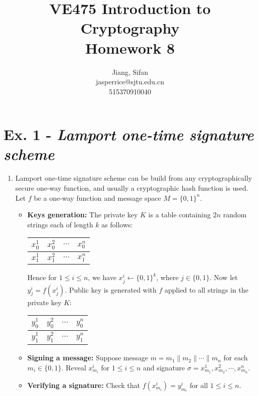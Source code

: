 \documentclass[11pt,a4paper]{article}
\title{
	VE475 Introduction to Cryptography \\
	Homework 8
}
\author{
	Jiang, Sifan\\
	jasperrice@sjtu.edu.cn\\
	515370910040
}
\begin{document}
\maketitle
\section*{Ex. 1 - \textit{Lamport one-time signature scheme}}
\begin{enumerate}
\item Lamport one-time signature scheme can be build from any cryptographically secure one-way function, and usually a cryptographic hash function is used. Let $f$ be a one-way function and message space $M = \{0, 1\}^{n}$.
	\begin{itemize}
	\item \textbf{Keys generation:} The private key $K$ is a table containing $2n$ random strings each of length $k$ as follows:
		\begin{table}[!ht]
			\centering
			\begin{tabular}{|c|c|c|c|}
				\hline
				$x_{0}^{1}$ & $x_{0}^{2}$ & $\cdots$ & $x_{0}^{n}$ \\
				\hline
				$x_{1}^{1}$ & $x_{1}^{2}$ & $\cdots$ & $x_{1}^{n}$ \\
				\hline
			\end{tabular}
		\end{table}
	\par Hence for $1 \leq i \leq n$, we have $x_{j}^{i} \leftarrow \{0, 1\}^{k}$, where $j \in \{0, 1\}$. Now let $y_{j}^{i} = f(x_{j}^{i})$. Public key is generated with $f$ applied to all strings in the private key $K$:
		\begin{table}[!ht]
			\centering
			\begin{tabular}{|c|c|c|c|}
				\hline
				$y_{0}^{1}$ & $y_{0}^{2}$ & $\cdots$ & $y_{0}^{n}$ \\
				\hline
				$y_{1}^{1}$ & $y_{1}^{2}$ & $\cdots$ & $y_{1}^{n}$ \\
				\hline
			\end{tabular}
		\end{table}
	
	\item \textbf{Signing a message:} Suppose message $m = m_{1} \| m_{2} \| \cdots \| m_{n}$ for each $m_{i} \in \{0, 1\}$. Reveal $x_{m_{i}}^{i}$ for $1 \leq i \leq n$ and signature $\sigma = x_{m_{1}}^{1}, x_{m_{2}}^{2}, \cdots, x_{m_{n}}^{n}$.
	
	\item \textbf{Verifying a signature:} Check that $f(x_{m_{i}}^{i}) = y_{m_{i}}^{i}$ for all $1 \leq i \leq n$.
	\end{itemize}


\end{enumerate}
\end{document}
